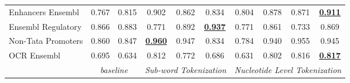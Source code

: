 \begin{table*}[h!]
\begin{center}
\begin{tabular}{l|cc|ccc|cccc}
Enhancers Ensembl & 0.767 & 0.815 & 0.902 & 0.862 & 0.834 & 0.804 & 0.878 & 0.871 & {\ul \textbf{0.911}} \\
Ensembl Regulatory & 0.866 & 0.883 & 0.771 & 0.892 & {\ul \textbf{0.937}} & 0.771 & 0.861 & 0.733 & 0.869 \\
Non-Tata Promoters & 0.860 & 0.847 & {\ul \textbf{0.960}} & 0.947 & 0.834 & 0.784 & 0.940 & 0.955 & 0.945 \\
OCR Ensembl & 0.695 & 0.634 & 0.812 & 0.772 & 0.686 & 0.631 & 0.802 & 0.816 & {\ul \textbf{0.817}} \\
\hline
\multicolumn{1}{l|}{} & \multicolumn{2}{c|}{\textit{baseline}} & \multicolumn{3}{c|}{\textit{Sub-word Tokenization}} & \multicolumn{4}{c}{\textit{Nucleotide Level Tokenization}} \\ \hline
\end{tabular}
\end{center}
\end{table*}
